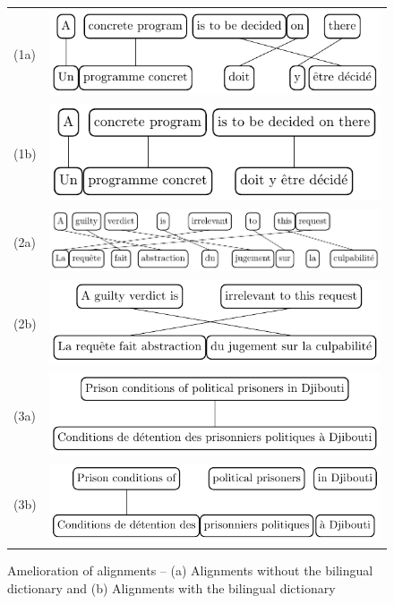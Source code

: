 \documentclass[output=paper,modfonts,nonflat]{langsci/langscibook}
\begin{document}
\begin{figure}
  \centering
  \begin{tabular}{l@{}C}
    (1a) & \includegraphics[scale=.85]{figures/figSemmar10}\\[1ex]
    (1b) & \includegraphics[scale=.85]{figures/figSemmar11}\\[2ex]
    (2a) & \includegraphics[scale=.85]{figures/figSemmar12}\\[1ex]
    (2b) & \includegraphics[scale=.85]{figures/figSemmar13}\\[2ex]
    (3a) & \includegraphics[scale=.85]{figures/figSemmar14}\\[1ex]
    (3b) & \includegraphics[scale=.85]{figures/figSemmar15}\\
  \end{tabular}
  \caption{\label{sem:fig:improvali}Amelioration of alignments -- (a) Alignments without the bilingual dictionary and (b) Alignments with the bilingual dictionary}
\end{figure}
\end{document}
